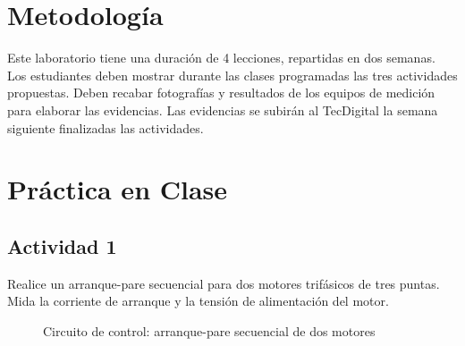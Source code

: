 \section{Metodología}

Este laboratorio tiene una duración de 4 lecciones, repartidas en dos semanas. Los estudiantes deben mostrar durante las clases programadas las tres actividades propuestas. Deben recabar fotografías y resultados de los equipos de medición para elaborar las evidencias. Las evidencias se subirán al TecDigital la semana siguiente finalizadas las actividades.

\section{Práctica en Clase}

\subsection{Actividad 1}

Realice un arranque-pare secuencial para dos motores trifásicos de tres puntas. Mida la corriente de arranque y la tensión de alimentación del motor.

\begin{figure}[H]
\centering
    \caption{Circuito de control: arranque-pare secuencial de dos motores}
    \label{fig:control-secuencial}
\end{figure}

